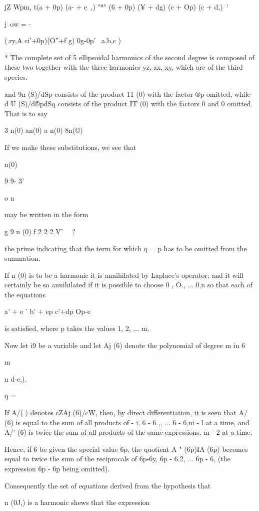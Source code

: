   jZ Wpm, t(a + 0p) (a- + e~,) "*" (6 + 0p) (¥ + dg) (c + Op) (c +
d,)\ '

j\ ow = -

(.ry,A ci'+0p)(O''+f g) 0g-0p' \ a,b,c )

* The complete set of 5 ellipsoidal harmonics of the second degree is
composed of these two together with the three harmonics yz, zx, xy,
which are of the third species.

%
%

and 9n (S)/dSp consists of the product 11 (0) with the factor ®p
omitted, while d U (S)/d®pdSq consists of the product IT (0) with the
factors 0 and 0 omitted. That is to say

3 n(0) an(0) a n(0) 8n(©)

If we make these substitutions, we see that

n(0)

9 9- 3'

 o n

may be written in the form

g 9 n (0) f 2 2 2 V' \ \ ?\

the prime indicating that the term for which q = p has to be omitted
from the summation.

If n (0) is to be a harmonic it is annihilated by Laplace's operator;
and it will certainly be so annihilated if it is possible to choose 0
, O., ... 0,n so that each of the equations

a' + e ' b' + ep c'+dp Op-e

is satisfied, where p takes the values 1, 2, ... m.

Now let i9 be a variable and let Aj (6) denote the polynomial of
degree m in 6

m

n d-e,).

q = \

If A/( ) denotes cZAj (6)/cW, then, by direct differentiation, it is
seen that A/ (6) is equal to the sum of all products of - i, 6 - 6.,,
... 6 - 6,ni - l at a time, and A/' (6) is twice the sum of all
products of the same expressions, m - 2 at a time.

Hence, if 6 be given the special value 6p, the quotient A " (6p)IA
(6p) becomes equal to twice the sum of the reciprocals of 6p-6y, 6p -
6.2, ... 6p - 6, (the expression 6p - 6p being omitted).

Consequently the set of equations derived from the hypothesis that

n (0J,) is a harmonic shews that the expression

